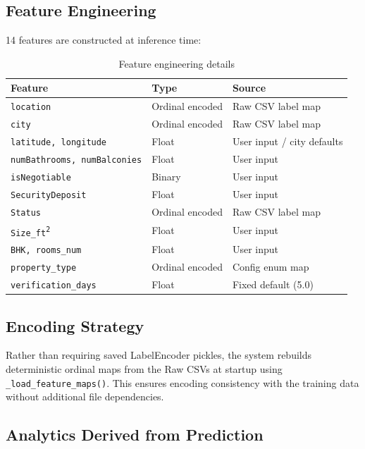 \documentclass[12pt,a4paper]{article}
\newcommand{\code}[1]{\texttt{\small #1}}
\begin{document}
\subsection{Feature Engineering}

14 features are constructed at inference time:

\begin{table}[H]
\centering
\caption{Feature engineering details}
\begin{tabular}{lll}
\toprule
\textbf{Feature} & \textbf{Type} & \textbf{Source} \\
\midrule
\code{location}            & Ordinal encoded & Raw CSV label map \\
\code{city}                & Ordinal encoded & Raw CSV label map \\
\code{latitude, longitude} & Float           & User input / city defaults \\
\code{numBathrooms, numBalconies} & Float    & User input \\
\code{isNegotiable}        & Binary          & User input \\
\code{SecurityDeposit}     & Float           & User input \\
\code{Status}              & Ordinal encoded & Raw CSV label map \\
\code{Size\_ft\textsuperscript{2}} & Float  & User input \\
\code{BHK, rooms\_num}     & Float           & User input \\
\code{property\_type}      & Ordinal encoded & Config enum map \\
\code{verification\_days}  & Float           & Fixed default (5.0) \\
\bottomrule
\end{tabular}
\end{table}

\subsection{Encoding Strategy}

Rather than requiring saved LabelEncoder pickles, the system rebuilds deterministic ordinal maps from the Raw CSVs at startup using \code{\_load\_feature\_maps()}. This ensures encoding consistency with the training data without additional file dependencies.

\subsection{Analytics Derived from Prediction}
\end{document}
